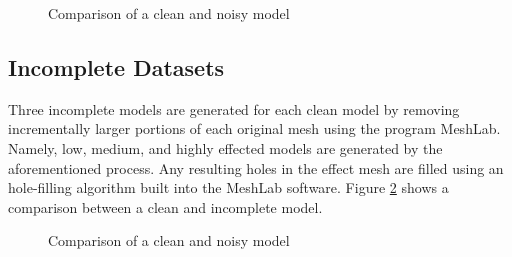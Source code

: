 \documentclass[12pt]{article}
\begin{document}
	\begin{figure}[!h]
		\centering
		\caption{Comparison of a clean and noisy model}
		\label{fig::veryNoisyCat}
	\end{figure}


	\subsection*{Incomplete Datasets}

		\noindent
		Three incomplete models are generated for each clean model by removing incrementally larger portions of each original mesh using the program MeshLab. Namely, low, medium, and highly effected models are generated by the aforementioned process. Any resulting holes in the effect mesh are filled using an hole-filling algorithm built into the MeshLab software. Figure \ref{fig::veryDeadCat} shows a comparison between a clean and incomplete model.
 
	\begin{figure}[!h]
		\centering
		\caption{Comparison of a clean and noisy model}
		\label{fig::veryDeadCat}
	\end{figure}
\end{document}
